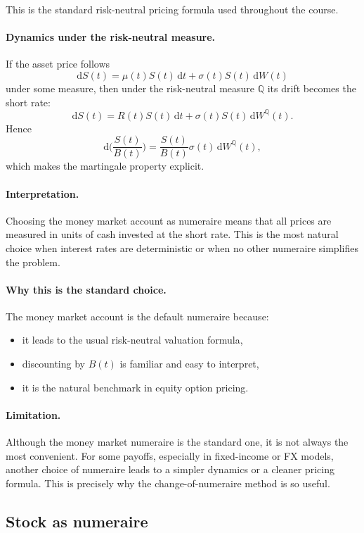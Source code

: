 \documentclass[11pt]{article}
\newcommand{\Qbb}{\mathbb{Q}}
\theoremstyle{definition}
\theoremstyle{plain}
\begin{document}
This is the standard risk-neutral pricing formula used throughout the
course.

\paragraph{Dynamics under the risk-neutral measure.}
If the asset price follows
\[
\mathrm{d}S(t)=\mu(t)S(t)\,\mathrm{d}t+\sigma(t)S(t)\,\mathrm{d}W(t)
\]
under some measure, then under the risk-neutral measure \(\Qbb\) its
drift becomes the short rate:
\[
\mathrm{d}S(t)=R(t)S(t)\,\mathrm{d}t+\sigma(t)S(t)\,\mathrm{d}W^\Qbb(t).
\]
Hence
\[
\mathrm{d}\Big(\frac{S(t)}{B(t)}\Big)
=
\frac{S(t)}{B(t)}\sigma(t)\,\mathrm{d}W^\Qbb(t),
\]
which makes the martingale property explicit.

\paragraph{Interpretation.}
Choosing the money market account as numeraire means that all prices are
measured in units of cash invested at the short rate.
This is the most natural choice when interest rates are deterministic or
when no other numeraire simplifies the problem.

\paragraph{Why this is the standard choice.}
The money market account is the default numeraire because:
\begin{itemize}[leftmargin=1.4em]
\item it leads to the usual risk-neutral valuation formula,
\item discounting by \(B(t)\) is familiar and easy to interpret,
\item it is the natural benchmark in equity option pricing.
\end{itemize}

\paragraph{Limitation.}
Although the money market numeraire is the standard one, it is not
always the most convenient.
For some payoffs, especially in fixed-income or FX models, another
choice of numeraire leads to a simpler dynamics or a cleaner pricing
formula.
This is precisely why the change-of-numeraire method is so useful.


\subsection{Stock as numeraire}
\end{document}

